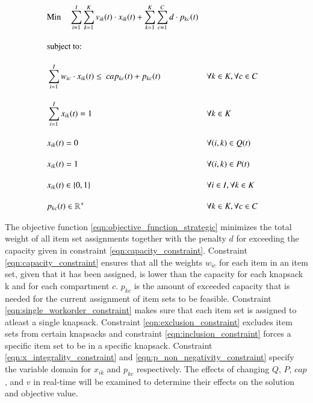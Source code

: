 \documentclass[preprint,12pt,authoryear]{elsarticle}
\begin{document}
\begin{alignat}{2}
	& \text{Min} \quad \sum_{i = 1}^{I} \sum_{k = 1}^{K} v_{ik}(t) \cdot x_{ik}(t) + \sum_{k = 1}^{K} \sum_{c = 1}^C d \cdot p_{kc}(t)   \label{eqn:objective_function_strategic} \\[1em]
    & \text{subject to:} \notag                                                                                                                                        \\[1em]
	& \sum_{i=1}^I w_{ic} \cdot x_{ik}(t) \leq \ cap_{kc}(t) + p_{kc}(t)        && \forall k \in K, \forall c \in C                      \label{eqn:capacity_constraint}          \\[1em]
	& \sum_{i = 1}^{I} x_{ik}(t) = 1                                            && \forall k \in K                                       \label{eqn:single_workorder_constraint}  \\[1em]
	& x_{ik}(t) = 0                                                             && \forall (i, k) \in Q(t)                               \label{eqn:exclusion_constraint}         \\[1em]
	& x_{ik}(t) = 1                                                             && \forall (i, k) \in P(t)                               \label{eqn:inclusion_constraint}         \\[1em]
	& x_{ik}(t) \in \{0, 1\}                                                    && \forall i \in I, \forall k \in K                      \label{eqn:x_integrality_constraint}     \\[1em] 
	& p_{kc}(t) \in \mathbb{R}^{+}                                              && \forall k \in K, \forall c \in C                      \label{eqn:p_non_negativity_constraint}
\end{alignat}

The objective function \ref{eqn:objective_function_strategic} minimizes the total weight of all item set assignments together with the penalty $d$ for exceeding the 
capacity given in constraint \ref{eqn:capacity_constraint}. Constraint \ref{eqn:capacity_constraint} ensures that all the weights $w_{ic}$ for each item in an item set, given that it
has been assigned, is lower than the capacity for each knapsack k and for each compartment $c$. $p_{kc}$ is the amount of exceeded capacity that is needed for the current assignment of item sets to be feasible.
Constraint \ref{eqn:single_workorder_constraint} makes sure that each item set is assigned to atleast a single knapsack. Constraint \ref{eqn:exclusion_constraint} excludes item sets from 
certain knapsacks and constraint \ref{eqn:inclusion_constraint}  forces a specific item set to be in a specific knapsack. Constraint \ref{eqn:x_integrality_constraint} and \ref{eqn:p_non_negativity_constraint} 
specify the variable domain for $x_{ik}$ and $p_{kc}$ respectively. The effects of changing $Q$, $P$, $cap$, and $v$ in real-time will be examined to determine their effects on the solution and objective value.
\end{document}

